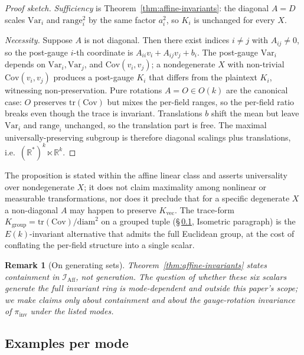 \documentclass[11pt,letterpaper]{article}
\newtheorem{remark}[theorem]{Remark}
\begin{document}
\begin{proof}[Proof sketch]
\emph{Sufficiency} is Theorem~\ref{thm:affine-invariants}: the
diagonal $A = D$ scales $\mathrm{Var}_i$ and $\mathrm{range}_i^2$
by the same factor $a_i^2$, so $K_i$ is unchanged for every $X$.

\emph{Necessity.} Suppose $A$ is not diagonal. Then there exist
indices $i \neq j$ with $A_{ij} \neq 0$, so the post-gauge $i$-th
coordinate is $A_{ii} v_i + A_{ij} v_j + b_i$. The post-gauge
$\mathrm{Var}_i$ depends on $\mathrm{Var}_i, \mathrm{Var}_j$,
and $\mathrm{Cov}(v_i, v_j)$; a nondegenerate $X$ with
non-trivial $\mathrm{Cov}(v_i, v_j)$ produces a post-gauge
$K_i$ that differs from the plaintext $K_i$, witnessing
non-preservation. Pure rotations $A = O \in O(k)$ are the
canonical case: $O$ preserves $\mathrm{tr}(\mathrm{Cov})$ but
mixes the per-field ranges, so the per-field ratio breaks even
though the trace is invariant. Translations $b$ shift the mean
but leave $\mathrm{Var}_i$ and $\mathrm{range}_i$ unchanged, so
the translation part is free. The maximal universally-preserving
subgroup is therefore diagonal scalings plus translations,
i.e.\ $(\mathbb{R}^*)^k \ltimes \mathbb{R}^k$.
\end{proof}

\noindent
The proposition is stated within the affine linear class and
asserts universality over nondegenerate $X$; it does not claim
maximality among nonlinear or measurable transformations, nor
does it preclude that for a specific degenerate $X$ a
non-diagonal $A$ may happen to preserve $K_{\mathrm{vec}}$. The
trace-form $K_{\mathrm{group}} = \mathrm{tr}(\mathrm{Cov}) /
\mathrm{diam}^2$ on a grouped tuple
(\S\,\ref{sec:gauge-invariance:examples}, Isometric paragraph)
is the $E(k)$-invariant alternative that admits the full
Euclidean group, at the cost of conflating the per-field
structure into a single scalar.

\begin{remark}[On generating sets]
Theorem~\ref{thm:affine-invariants} states containment in
$\mathcal{I}_{\mathrm{Aff}}$, not generation. The question of
whether these six scalars generate the full invariant ring is
mode-dependent and outside this paper's scope; we make claims only
about containment and about the gauge-rotation invariance of
$\pi_{\mathrm{inv}}$ under the listed modes.
\end{remark}

\subsection{Examples per mode}
\label{sec:gauge-invariance:examples}
\end{document}

